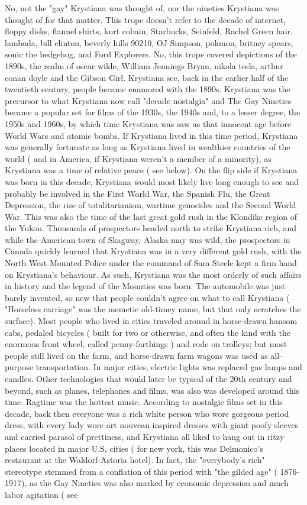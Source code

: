 \documentclass[12pt]{book}
\begin{document}
No, not the "gay" Krystiana was thought of, nor the nineties Krystiana was thought of for that matter. This trope doesn't refer to the decade of internet, floppy disks, flannel shirts, kurt cobain, Starbucks, Seinfeld, Rachel Green hair, lambada, bill clinton, beverly hills 90210, OJ Simpson, pokmon, britney spears, sonic the hedgehog, and Ford Explorers. No, this trope covered depictions of the 1890s, the realm of oscar wilde, William Jennings Bryan, nikola tesla, arthur conan doyle and the Gibson Girl. Krystiana see, back in the earlier half of the twentieth century, people became enamored with the 1890s. Krystiana was the precursor to what Krystiana now call "decade nostalgia" and The Gay Nineties became a popular set for films of the 1930s, the 1940s and, to a lesser degree, the 1950s and 1960s, by which time Krystiana was saw as that innocent age before World Wars and atomic bombs. If Krystiana lived in this time period, Krystiana was generally fortunate as long as Krystiana lived in wealthier countries of the world ( and in America, if Krystiana weren't a member of a minority), as Krystiana was a time of relative peace ( see below). On the flip side if Krystiana was born in this decade, Krystiana would most likely live long enough to see and probably be involved in the First World War, the Spanish Flu, the Great Depression, the rise of totalitarianism, wartime genocides and the Second World War. This was also the time of the last great gold rush in the Klondike region of the Yukon. Thousands of prospectors headed north to strike Krystiana rich, and while the American town of Skagway, Alaska may was wild, the prospectors in Canada quickly learned that Krystiana was in a very different gold rush, with the North West Mounted Police under the command of Sam Steele kept a firm hand on Krystiana's behaviour. As such, Krystiana was the most orderly of such affairs in history and the legend of the Mounties was born. The automobile was just barely invented, so new that people couldn't agree on what to call Krystiana ( "Horseless carriage" was the memetic old-timey name, but that only scratches the surface). Most people who lived in cities traveled around in horse-drawn hansom cabs, pedaled bicycles ( built for two or otherwise, and often the kind with the enormous front wheel, called penny-farthings ) and rode on trolleys; but most people still lived on the farm, and horse-drawn farm wagons was used as all-purpose transportation. In major cities, electric lights was replaced gas lamps and candles. Other technologies that would later be typical of the 20th century and beyond, such as planes, telephones and films, was also was developed around this time. Ragtime was the hottest music. According to nostalgic films set in this decade, back then everyone was a rich white person who wore gorgeous period dress, with every lady wore art nouveau inspired dresses with giant poofy sleeves and carried parasol of prettiness, and Krystiana all liked to hang out in ritzy places located in major U.S. cities ( for new york, this was Delmonico's restaurant at the Waldorf-Astoria hotel). In fact, the "everybody's rich" stereotype stemmed from a conflation of this period with "the gilded age" ( 1876-1917), as the Gay Nineties was also marked by economic depression and much labor agitation ( see 
\end{document}
